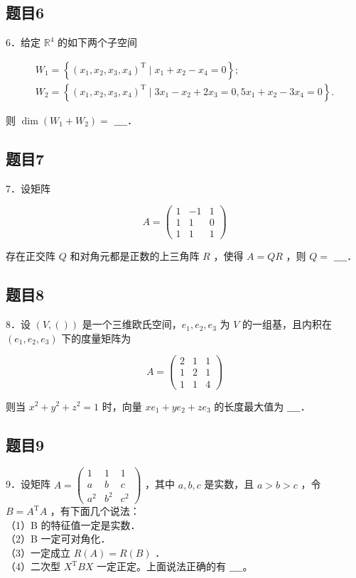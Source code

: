 \documentclass{article}
\begin{document}
\subsection{题目6}
6．给定 \(\mathbb{R}^{4}\) 的如下两个子空间

\[
\begin{gathered}
W_{1}=\left\{\left(x_{1}, x_{2}, x_{3}, x_{4}\right)^{\mathrm{T}} \mid x_{1}+x_{2}-x_{4}=0\right\} ; \\
W_{2}=\left\{\left(x_{1}, x_{2}, x_{3}, x_{4}\right)^{\mathrm{T}} \mid 3 x_{1}-x_{2}+2 x_{3}=0,5 x_{1}+x_{2}-3 x_{4}=0\right\} .
\end{gathered}
\]

则 \(\operatorname{dim}\left(W_{1}+W_{2}\right)=\) \(\_\_\_\_\)．

\subsection{题目7}
7．设矩阵

\[
A=\left(\begin{array}{ccc}
1 & -1 & 1 \\
1 & 1 & 0 \\
1 & 1 & 1
\end{array}\right)
\]

存在正交阵 \(Q\) 和对角元都是正数的上三角阵 \(R\) ，使得 \(A=Q R\) ，则 \(Q=\) \(\_\_\_\_\)．

\subsection{题目8}
8．设 \((V,())\) 是一个三维欧氏空间，\(e_{1}, e_{2}, e_{3}\) 为 \(V\) 的一组基，且内积在 \(\left(e_{1}, e_{2}, e_{3}\right)\) 下的度量矩阵为

\[
A=\left(\begin{array}{lll}
2 & 1 & 1 \\
1 & 2 & 1 \\
1 & 1 & 4
\end{array}\right)
\]

则当 \(x^{2}+y^{2}+z^{2}=1\) 时，向量 \(x e_{1}+y e_{2}+z e_{3}\) 的长度最大值为 \(\_\_\_\_\)．

\subsection{题目9}
9．设矩阵 \(A=\left(\begin{array}{ccc}1 & 1 & 1 \\ a & b & c \\ a^{2} & b^{2} & c^{2}\end{array}\right)\) ，其中 \(a, b, c\) 是实数，且 \(a>b>c\) ，令 \(B=A^{\mathrm{T}} A\) ，有下面几个说法：\\
（1）B 的特征值一定是实数．\\
（2）B 一定可对角化．\\
（3）一定成立 \(R(A)=R(B)\) ．\\
（4）二次型 \(X^{\mathrm{T}} B X\) 一定正定。上面说法正确的有 \(\_\_\_\_\)。
\end{document}
